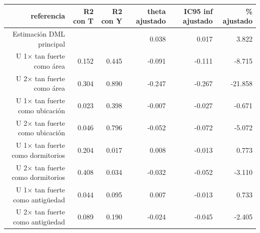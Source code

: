 \begin{tabular}{rrrrrr}
\toprule
referencia & R2 con T & R2 con Y & theta ajustado & IC95 inf ajustado & \% ajustado \\
\midrule
Estimación DML principal &  &  & 0.038 & 0.017 & 3.822 \\
U 1× tan fuerte como área & 0.152 & 0.445 & -0.091 & -0.111 & -8.715 \\
U 2× tan fuerte como área & 0.304 & 0.890 & -0.247 & -0.267 & -21.858 \\
U 1× tan fuerte como ubicación & 0.023 & 0.398 & -0.007 & -0.027 & -0.671 \\
U 2× tan fuerte como ubicación & 0.046 & 0.796 & -0.052 & -0.072 & -5.072 \\
U 1× tan fuerte como dormitorios & 0.204 & 0.017 & 0.008 & -0.013 & 0.773 \\
U 2× tan fuerte como dormitorios & 0.408 & 0.034 & -0.032 & -0.052 & -3.110 \\
U 1× tan fuerte como antigüedad & 0.044 & 0.095 & 0.007 & -0.013 & 0.733 \\
U 2× tan fuerte como antigüedad & 0.089 & 0.190 & -0.024 & -0.045 & -2.405 \\
\bottomrule
\end{tabular}